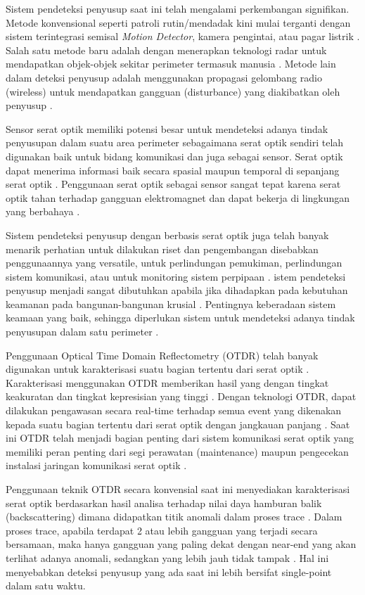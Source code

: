 \documentclass[12pt]{article}
\begin{document}
	Sistem pendeteksi penyusup saat ini telah mengalami perkembangan signifikan.
	Metode konvensional seperti patroli rutin/mendadak kini mulai terganti dengan sistem terintegrasi semisal \textit{Motion Detector}, kamera pengintai, atau pagar listrik \cite{AFL2011}.
	Salah satu metode baru adalah dengan menerapkan teknologi radar untuk mendapatkan objek-objek sekitar perimeter termasuk manusia \cite{Cory1998}.
	Metode lain dalam deteksi penyusup adalah menggunakan propagasi gelombang radio (wireless) untuk mendapatkan gangguan (disturbance) yang diakibatkan oleh penyusup \cite{Elmorsy}\cite{Elmorsy2014}.
	
	Sensor serat optik memiliki potensi besar untuk mendeteksi adanya tindak penyusupan dalam suatu area perimeter sebagaimana serat optik sendiri telah digunakan baik untuk bidang komunikasi dan juga sebagai sensor.
	Serat optik dapat menerima informasi baik secara spasial maupun temporal di sepanjang serat optik \cite{Rao2008}.
	Penggunaan serat optik sebagai sensor sangat tepat karena serat optik tahan terhadap gangguan elektromagnet dan dapat bekerja di lingkungan yang berbahaya \cite{Bremer2016}.
	
	Sistem pendeteksi penyusup dengan berbasis serat optik juga telah banyak menarik perhatian untuk dilakukan riset dan pengembangan disebabkan penggunaannya yang versatile, untuk perlindungan pemukiman, perlindungan sistem komunikasi, atau untuk monitoring sistem perpipaan \cite{Lai2017}.
	istem pendeteksi penyusup menjadi sangat dibutuhkan apabila jika dihadapkan pada kebutuhan keamanan pada bangunan-bangunan krusial \cite{Quwaider2017}.
	Pentingnya keberadaan sistem keamaan yang baik, sehingga diperlukan sistem untuk mendeteksi adanya tindak penyusupan dalam satu perimeter \cite{Huang2017}.
	
	Penggunaan Optical Time Domain Reflectometry (OTDR) telah banyak digunakan untuk karakterisasi suatu bagian tertentu dari serat optik \cite{Dong2015}.
	Karakterisasi menggunakan OTDR memberikan hasil yang dengan tingkat keakuratan dan tingkat kepresisian yang tinggi \cite{He2016}.
	Dengan teknologi OTDR, dapat dilakukan pengawasan secara real-time terhadap semua event yang dikenakan kepada suatu bagian tertentu dari serat optik dengan jangkauan panjang \cite{Optical2007}.
	Saat ini OTDR telah menjadi bagian penting dari sistem komunikasi serat optik yang memiliki peran penting dari segi perawatan (maintenance) maupun pengecekan instalasi jaringan komunikasi serat optik \cite{Nettest2000}.
	
	Penggunaan teknik OTDR secara konvensial saat ini menyediakan karakterisasi serat optik berdasarkan hasil analisa terhadap nilai daya hamburan balik (backscattering) dimana didapatkan titik anomali dalam proses trace \cite{Dong2015}.
	Dalam proses trace, apabila terdapat 2 atau lebih gangguan yang terjadi secara bersamaan, maka hanya gangguan yang paling dekat dengan near-end  yang akan terlihat adanya anomali, sedangkan yang lebih jauh tidak tampak \cite{Bao2012}.
	Hal ini menyebabkan deteksi penyusup yang ada saat ini lebih bersifat single-point dalam satu waktu. 
	
\end{document}
